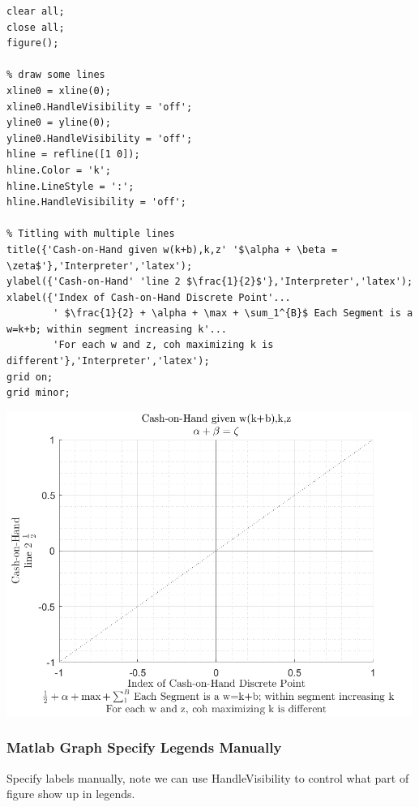 \documentclass[
]{book}
\begin{document}
\begin{verbatim}
clear all;
close all;
figure();

% draw some lines
xline0 = xline(0);
xline0.HandleVisibility = 'off';
yline0 = yline(0);
yline0.HandleVisibility = 'off';
hline = refline([1 0]);
hline.Color = 'k';
hline.LineStyle = ':';
hline.HandleVisibility = 'off';

% Titling with multiple lines
title({'Cash-on-Hand given w(k+b),k,z' '$\alpha + \beta = \zeta$'},'Interpreter','latex');
ylabel({'Cash-on-Hand' 'line 2 $\frac{1}{2}$'},'Interpreter','latex');
xlabel({'Index of Cash-on-Hand Discrete Point'...
        ' $\frac{1}{2} + \alpha + \max + \sum_1^{B}$ Each Segment is a w=k+b; within segment increasing k'...
        'For each w and z, coh maximizing k is different'},'Interpreter','latex');
grid on;
grid minor;
\end{verbatim}

\includegraphics[width=5.20833in,height=\textheight]{img/fs_titling_images/figure_0.png}

\hypertarget{matlab-graph-specify-legends-manually}{%
\subsubsection{Matlab Graph Specify Legends Manually}\label{matlab-graph-specify-legends-manually}}

Specify labels manually, note we can use HandleVisibility to control
what part of figure show up in legends.
\end{document}
